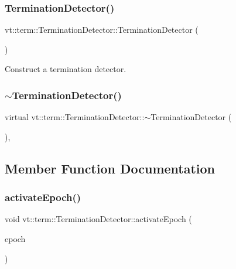 \subsubsection{\texorpdfstring{Termination\+Detector()}{TerminationDetector()}}
{\footnotesize\ttfamily vt\+::term\+::\+Termination\+Detector\+::\+Termination\+Detector (\begin{DoxyParamCaption}{ }\end{DoxyParamCaption})}



Construct a termination detector. 

\mbox{\label{structvt_1_1term_1_1_termination_detector_a1a1a29c2374a70427d8173ec31d55421}} 
\subsubsection{\texorpdfstring{$\sim$\+Termination\+Detector()}{~TerminationDetector()}}
{\footnotesize\ttfamily virtual vt\+::term\+::\+Termination\+Detector\+::$\sim$\+Termination\+Detector (\begin{DoxyParamCaption}{ }\end{DoxyParamCaption})\hspace{0.3cm}{\ttfamily [inline]}, {\ttfamily [virtual]}}



\subsection{Member Function Documentation}
\mbox{\label{structvt_1_1term_1_1_termination_detector_af9f932ff57f12da573a75adbbaee73df}} 
\subsubsection{\texorpdfstring{activate\+Epoch()}{activateEpoch()}}
{\footnotesize\ttfamily void vt\+::term\+::\+Termination\+Detector\+::activate\+Epoch (\begin{DoxyParamCaption}\item[{\hyperlink{namespacevt_a985a5adf291c34a3ca263b3378388236}{Epoch\+Type} const \&}]{epoch }\end{DoxyParamCaption})}



